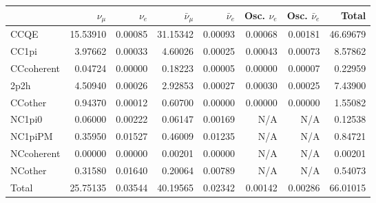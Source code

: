 \begin{tabular} { | l ||r | r | r | r | r | r | | r | }
\hline
              & $\nu_\mu$            & $\nu_e$              & $\bar{\nu}_{\mu}$    & $\bar{\nu}_{e}$      & Osc. $\nu_e$         & Osc. $\bar{\nu}_{e}$ & Total                \\ \hline\hline
 CCQE         & 15.53910             & 0.00085              & 31.15342             & 0.00093              & 0.00068              & 0.00181              & 46.69679             \\ \hline
 CC1pi        & 3.97662              & 0.00033              & 4.60026              & 0.00025              & 0.00043              & 0.00073              & 8.57862              \\ \hline
 CCcoherent   & 0.04724              & 0.00000              & 0.18223              & 0.00005              & 0.00000              & 0.00007              & 0.22959              \\ \hline
 2p2h         & 4.50940              & 0.00026              & 2.92853              & 0.00027              & 0.00030              & 0.00025              & 7.43900              \\ \hline
 CCother      & 0.94370              & 0.00012              & 0.60700              & 0.00000              & 0.00000              & 0.00000              & 1.55082              \\ \hline
 NC1pi0       & 0.06000              & 0.00222              & 0.06147              & 0.00169              & N/A                  & N/A                  & 0.12538              \\ \hline
 NC1piPM      & 0.35950              & 0.01527              & 0.46009              & 0.01235              & N/A                  & N/A                  & 0.84721              \\ \hline
 NCcoherent   & 0.00000              & 0.00000              & 0.00201              & 0.00000              & N/A                  & N/A                  & 0.00201              \\ \hline
 NCother      & 0.31580              & 0.01640              & 0.20064              & 0.00789              & N/A                  & N/A                  & 0.54073              \\ \hline
\hline
 Total        & 25.75135             & 0.03544              & 40.19565             & 0.02342              & 0.00142              & 0.00286              & 66.01015             \\ \hline

\end{tabular}
